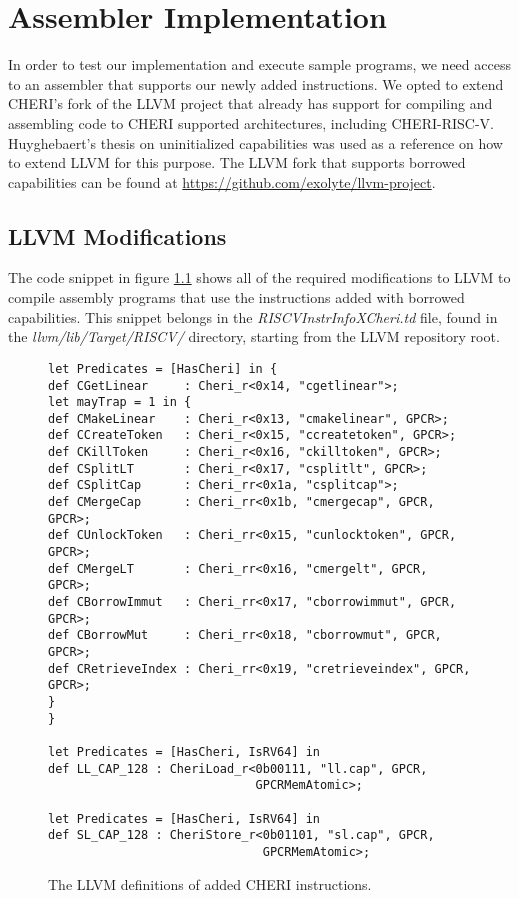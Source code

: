 \chapter{Assembler Implementation}
\label{chap:assemblerimpl}
In order to test our implementation and execute sample programs, we need access to an assembler that supports our newly added instructions. We opted to extend CHERI's fork of the LLVM project that already has support for compiling and assembling code to CHERI supported architectures, including CHERI-RISC-V.
Huyghebaert's thesis on uninitialized capabilities \cite{uninitcap} was used as a reference on how to extend LLVM for this purpose.
The LLVM fork that supports borrowed capabilities can be found at \url{https://github.com/exolyte/llvm-project}.

\section{LLVM Modifications}
The code snippet in figure \ref{code:llvmdefs} shows all of the required modifications to LLVM to compile assembly programs that use the instructions added with borrowed capabilities. This snippet belongs in the \textit{RISCVInstrInfoXCheri.td} file, found in the \textit{llvm/lib/Target/RISCV/} directory, starting from the LLVM repository root.

\begin{figure}[h]
\begin{verbatim}
let Predicates = [HasCheri] in {
def CGetLinear     : Cheri_r<0x14, "cgetlinear">;
let mayTrap = 1 in {
def CMakeLinear    : Cheri_r<0x13, "cmakelinear", GPCR>;
def CCreateToken   : Cheri_r<0x15, "ccreatetoken", GPCR>;
def CKillToken     : Cheri_r<0x16, "ckilltoken", GPCR>;
def CSplitLT       : Cheri_r<0x17, "csplitlt", GPCR>;
def CSplitCap      : Cheri_rr<0x1a, "csplitcap">;
def CMergeCap      : Cheri_rr<0x1b, "cmergecap", GPCR, GPCR>;
def CUnlockToken   : Cheri_rr<0x15, "cunlocktoken", GPCR, GPCR>;
def CMergeLT       : Cheri_rr<0x16, "cmergelt", GPCR, GPCR>;
def CBorrowImmut   : Cheri_rr<0x17, "cborrowimmut", GPCR, GPCR>;
def CBorrowMut     : Cheri_rr<0x18, "cborrowmut", GPCR, GPCR>;
def CRetrieveIndex : Cheri_rr<0x19, "cretrieveindex", GPCR, GPCR>;
}
}

let Predicates = [HasCheri, IsRV64] in
def LL_CAP_128 : CheriLoad_r<0b00111, "ll.cap", GPCR,
                             GPCRMemAtomic>;

let Predicates = [HasCheri, IsRV64] in
def SL_CAP_128 : CheriStore_r<0b01101, "sl.cap", GPCR,
                              GPCRMemAtomic>;
\end{verbatim}
\caption{The LLVM definitions of added CHERI instructions.}
\label{code:llvmdefs}
\end{figure}

